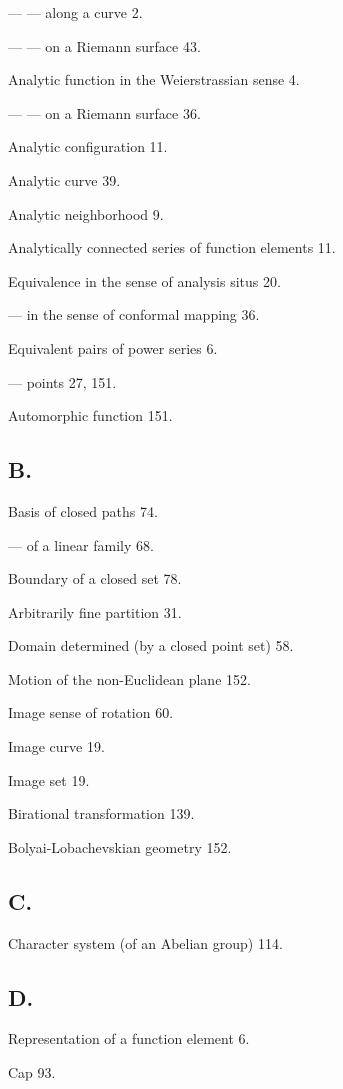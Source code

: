 \documentclass{article}
\begin{document}
--- --- along a curve 2.

--- --- on a Riemann surface 43.

Analytic function in the Weierstrassian sense 4.

--- --- on a Riemann surface 36.

Analytic configuration 11.

Analytic curve 39.

Analytic neighborhood 9.

Analytically connected series of function elements 11.

Equivalence in the sense of analysis situs 20.

--- in the sense of conformal mapping 36.

Equivalent pairs of power series 6.

--- points 27, 151.

Automorphic function 151.

\subsection*{B.}

Basis of closed paths 74.

--- of a linear family 68.

Boundary of a closed set 78.

Arbitrarily fine partition 31.

Domain determined (by a closed point set) 58.

Motion of the non-Euclidean plane 152.

Image sense of rotation 60.

Image curve 19.

Image set 19.

Birational transformation 139.

Bolyai-Lobachevskian geometry 152.

\subsection*{C.}

Character system (of an Abelian group) 114.

\subsection*{D.}

Representation of a function element 6.

Cap 93.
\end{document}
